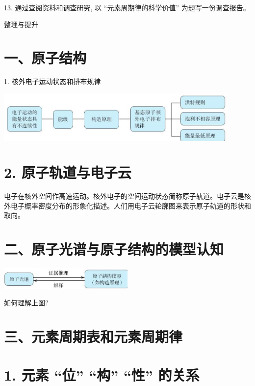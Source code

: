 \documentclass[10pt]{article}
\begin{document}
13. 通过查阅资料和调查研究, 以 “元素周期律的科学价值” 为题写一份调查报告。

整理与提升

\section*{一、原子结构}

1. 核外电子运动状态和排布规律

\begin{center}
\includegraphics[max width=0.9\textwidth]{images/0190e026-5a11-7df7-bd27-54d09026ba7a_33_758165.jpg}
\end{center}

\section*{2. 原子轨道与电子云}

电子在核外空间作高速运动。核外电子的空间运动状态简称原子轨道。电子云是核外电子概率密度分布的形象化描述。人们用电子云轮廓图来表示原子轨道的形状和取向。

\section*{二、原子光谱与原子结构的模型认知}

\begin{center}
\includegraphics[max width=0.5\textwidth]{images/0190e026-5a11-7df7-bd27-54d09026ba7a_33_108880.jpg}
\end{center}

如何理解上图?

\section*{三、元素周期表和元素周期律}

\section*{1. 元素 “位” “构” “性” 的关系}
\end{document}
